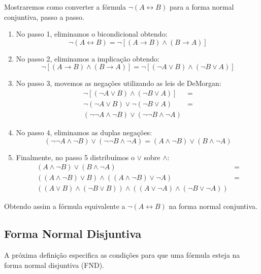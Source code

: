 \begin{Example}
Mostraremos como converter a fórmula $\neg (A\leftrightarrow B)$ para
a forma normal conjuntiva, passo a passo.
\begin{enumerate}
  \item No passo 1, eliminamos o bicondicional
    obtendo: \[\neg(A\leftrightarrow B) = \neg[(A \to
    B)\land (B\to A)]\]
  \item No passo 2, eliminamos a implicação obtendo:
   \[\neg[(A \to
    B)\land (B\to A)]  = \neg[(\neg A \lor B) \land (\neg B \lor A)]\]
  \item No passo 3, movemos as negações utilizando as leis de
    DeMorgan:
   \[
       \begin{array}{lc}
         \neg[(\neg A \lor B) \land (\neg B \lor A)] & =\\
         \neg (\neg A \lor B) \lor \neg (\neg B \lor A) & = \\
         (\neg\neg A \land \neg B) \lor (\neg\neg B\land\neg A)
       \end{array}
   \]
   \item No passo 4, eliminamos as duplas negações:
  \[         (\neg\neg A \land \neg B) \lor (\neg\neg B\land\neg A) =
  (A \land \neg B) \lor (B\land\neg A)\]
  \item Finalmente, no passo 5 distribuímos o $\lor$ sobre $\land$:
  \[
      \begin{array}{lc}
        (A \land \neg B) \lor (B\land\neg A) & = \\
        ((A\land \neg B) \lor B) \land ((A \land \neg B) \lor \neg A)
        & = \\
        ((A \lor B) \land (\neg B \lor B)) \land ((A \lor \neg A)
        \land (\neg B \lor \neg A))
      \end{array}
  \]
\end{enumerate}
Obtendo assim a fórmula equivalente a $\neg (A\leftrightarrow B)$ na
forma normal conjuntiva.
\end{Example}


\subsection{Forma Normal Disjuntiva}


A próxima definição especifica as condições para que uma fórmula
esteja na forma normal disjuntiva (FND).

